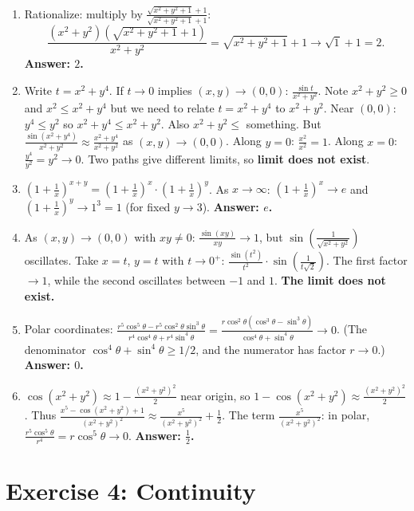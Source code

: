 \documentclass[12pt,a4paper]{article}
\begin{document}
\begin{enumerate}[leftmargin=*, label=(\alph*)]
\item Rationalize: multiply by $\frac{\sqrt{x^2+y^2+1}+1}{\sqrt{x^2+y^2+1}+1}$:
\[\frac{(x^2+y^2)(\sqrt{x^2+y^2+1}+1)}{x^2+y^2}=\sqrt{x^2+y^2+1}+1\to\sqrt{1}+1=2.\]
\textbf{Answer: $2$.}

\item Write $t=x^2+y^4$. If $t\to 0$ implies $(x,y)\to (0,0)$: $\frac{\sin t}{x^2+y^2}$.
Note $x^2+y^2\ge 0$ and $x^2\le x^2+y^4$ but we need to relate $t=x^2+y^4$ to $x^2+y^2$.
Near $(0,0)$: $y^4\le y^2$ so $x^2+y^4\le x^2+y^2$. Also $x^2+y^2\le$ something.
But $\frac{\sin(x^2+y^4)}{x^2+y^2}\approx\frac{x^2+y^4}{x^2+y^2}$ as $(x,y)\to(0,0)$.
Along $y=0$: $\frac{x^2}{x^2}=1$. Along $x=0$: $\frac{y^4}{y^2}=y^2\to 0$.
Two paths give different limits, so \textbf{limit does not exist}.

\item $\left(1+\frac{1}{x}\right)^{x+y}=\left(1+\frac{1}{x}\right)^x\cdot\left(1+\frac{1}{x}\right)^y$.
As $x\to\infty$: $\left(1+\frac{1}{x}\right)^x\to e$ and $\left(1+\frac{1}{x}\right)^y\to 1^3=1$ (for fixed $y\to 3$).
\textbf{Answer: $e$.}

\item As $(x,y)\to(0,0)$ with $xy\ne 0$: $\frac{\sin(xy)}{xy}\to 1$, but $\sin\!\left(\frac{1}{\sqrt{x^2+y^2}}\right)$ oscillates.
Take $x=t$, $y=t$ with $t\to 0^+$: $\frac{\sin(t^2)}{t^2}\cdot\sin\!\left(\frac{1}{t\sqrt{2}}\right)$.
The first factor $\to 1$, while the second oscillates between $-1$ and $1$.
\textbf{The limit does not exist.}

\item Polar coordinates: $\frac{r^5\cos^5\theta-r^5\cos^2\theta\sin^3\theta}{r^4\cos^4\theta+r^4\sin^4\theta}=\frac{r\cos^2\theta(\cos^3\theta-\sin^3\theta)}{\cos^4\theta+\sin^4\theta}\to 0$.
(The denominator $\cos^4\theta+\sin^4\theta\ge 1/2$, and the numerator has factor $r\to 0$.)
\textbf{Answer: $0$.}

\item $\cos(x^2+y^2)\approx 1-\frac{(x^2+y^2)^2}{2}$ near origin, so $1-\cos(x^2+y^2)\approx\frac{(x^2+y^2)^2}{2}$.
Thus $\frac{x^5-\cos(x^2+y^2)+1}{(x^2+y^2)^2}\approx\frac{x^5}{(x^2+y^2)^2}+\frac{1}{2}$.
The term $\frac{x^5}{(x^2+y^2)^2}$: in polar, $\frac{r^5\cos^5\theta}{r^4}=r\cos^5\theta\to 0$.
\textbf{Answer: $\frac{1}{2}$.}

\end{enumerate}

\section*{Exercise 4: Continuity}
\end{document}
